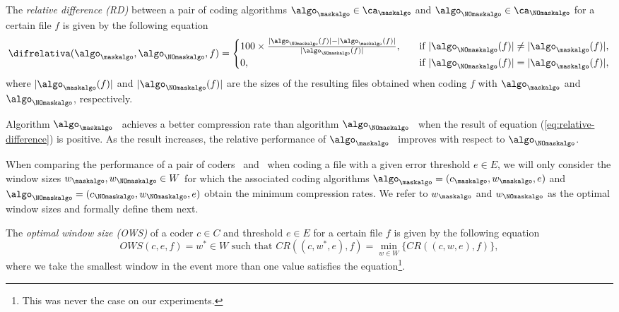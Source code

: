 \vspace{+5pt}
\begin{defcion}
The \textit{relative difference (RD)} between a pair of coding algorithms $\algo_\maskalgo \in {\ca}_\maskalgo$ and $\algo_\NOmaskalgo \in {\ca}_\NOmaskalgo$ for a certain file $f$ is given by the following equation
\begin{equation}
\label{eq:relative-difference}
\difrelativa(\algo_\maskalgo, \algo_\NOmaskalgo, f)  =
\begin{cases}
100\times\frac{|\algo_\NOmaskalgo (f)| - |\algo_\maskalgo (f)|}{ |\algo_\NOmaskalgo (f)| }, \quad & \text{if } |\algo_\NOmaskalgo (f)| \ne |\algo_\maskalgo (f)|, \\
0,                   & \text{if } |\algo_\NOmaskalgo (f)| = |\algo_\maskalgo (f)|,
\end{cases}
\end{equation}
where $|\algo_\maskalgo(f)|$ and $|\algo_\NOmaskalgo(f)|$ are the sizes of the resulting files obtained when coding $f$ with $\algo_\maskalgo$ and $\algo_\NOmaskalgo$, respectively. 
\end{defcion}

Algorithm $\algo_\maskalgo$ \ achieves a better compression rate than algorithm $\algo_\NOmaskalgo$ \ when the result of equation (\ref{eq:relative-difference}) is positive. As the result increases, the relative performance of $\algo_\maskalgo$ \ improves with respect to $\algo_\NOmaskalgo$.

When comparing the performance of a pair of coders \cmaskalgo \ and \cNOmaskalgo \ when coding a file with a given error threshold $e \in E$, we will only consider the window sizes $w_\maskalgo, w_\NOmaskalgo \in W$ for which the associated coding algorithms $\algo_\maskalgo = (c_\maskalgo, w_\maskalgo, e)$ and $\algo_\NOmaskalgo = (c_\NOmaskalgo, w_\NOmaskalgo, e)$ obtain the minimum compression rates. We refer to $w_\maskalgo$ and $w_\NOmaskalgo$ as the optimal window sizes and formally define them next.

\newcommand{\footows}{This was never the case on our experiments.}
\begin{defcion}
The \textit{optimal window size (OWS)} of a coder $c \in C$ and threshold $e \in E$ for a certain file $f$ is given by the following equation
\begin{equation}
OWS(c, e, f) = w^{*} \in W \text{ such that } CR((c, w^{*}, e), f) = \min_{w \in W} \biggl\{ CR((c, w, e), f) \biggr\},
\end{equation}
where we take the smallest window in the event more than one value satisfies the equation\footnote{\footows}.
\end{defcion}

